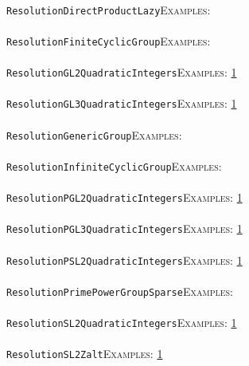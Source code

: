 \documentclass[a4paper,11pt]{report}
\begin{document}
{{ \\
 \texttt{ResolutionDirectProductLazy}{\nobreakspace}{\nobreakspace}{\nobreakspace}{\nobreakspace}\textsc{Examples:} \\
 \\
 \texttt{ResolutionFiniteCyclicGroup}{\nobreakspace}{\nobreakspace}{\nobreakspace}{\nobreakspace}\textsc{Examples:} \\
 \\
 \texttt{ResolutionGL2QuadraticIntegers}{\nobreakspace}{\nobreakspace}{\nobreakspace}{\nobreakspace}\textsc{Examples:} \href{tutorial/chap10.html} {1}{\nobreakspace} \\
 \\
 \texttt{ResolutionGL3QuadraticIntegers}{\nobreakspace}{\nobreakspace}{\nobreakspace}{\nobreakspace}\textsc{Examples:} \href{tutorial/chap10.html} {1}{\nobreakspace} \\
 \\
 \texttt{ResolutionGenericGroup}{\nobreakspace}{\nobreakspace}{\nobreakspace}{\nobreakspace}\textsc{Examples:} \\
 \\
 \texttt{ResolutionInfiniteCyclicGroup}{\nobreakspace}{\nobreakspace}{\nobreakspace}{\nobreakspace}\textsc{Examples:} \\
 \\
 \texttt{ResolutionPGL2QuadraticIntegers}{\nobreakspace}{\nobreakspace}{\nobreakspace}{\nobreakspace}\textsc{Examples:} \href{tutorial/chap10.html} {1}{\nobreakspace} \\
 \\
 \texttt{ResolutionPGL3QuadraticIntegers}{\nobreakspace}{\nobreakspace}{\nobreakspace}{\nobreakspace}\textsc{Examples:} \href{tutorial/chap10.html} {1}{\nobreakspace} \\
 \\
 \texttt{ResolutionPSL2QuadraticIntegers}{\nobreakspace}{\nobreakspace}{\nobreakspace}{\nobreakspace}\textsc{Examples:} \href{tutorial/chap10.html} {1}{\nobreakspace} \\
 \\
 \texttt{ResolutionPrimePowerGroupSparse}{\nobreakspace}{\nobreakspace}{\nobreakspace}{\nobreakspace}\textsc{Examples:} \\
 \\
 \texttt{ResolutionSL2QuadraticIntegers}{\nobreakspace}{\nobreakspace}{\nobreakspace}{\nobreakspace}\textsc{Examples:} \href{tutorial/chap10.html} {1}{\nobreakspace} \\
 \\
 \texttt{ResolutionSL2Z{\textunderscore}alt}{\nobreakspace}{\nobreakspace}{\nobreakspace}{\nobreakspace}\textsc{Examples:} \href{tutorial/chap10.html} {1}{\nobreakspace} \\
}}
\end{document}
